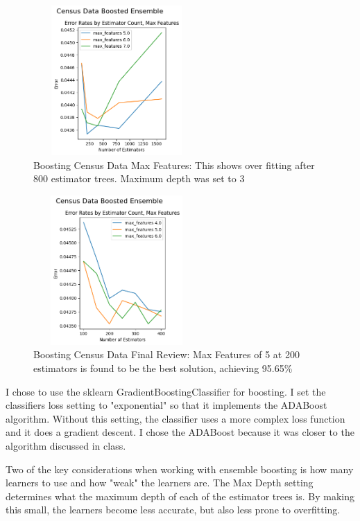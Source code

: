\documentclass[letterpaper]{article} %
\begin{document}
\begin{figure}[htb]
\centering
\includegraphics[width=2.5in, height=2.25in]{figures/Census_Data_Boosting_Estimator_Count_by_Max_Depth_boosting_3.png}
\caption{Boosting Census Data Max Features:  This shows over fitting after 800 estimator trees.  Maximum depth was set to 3  }
\label{fig:boosting_census_3}
\end{figure}

\begin{figure}[htb]
\centering
\includegraphics[width=2.5in, height=2.25in]{figures/Census_Data_Boosting_Estimator_Count_by_Max_Depth_boosting_4.png}
\caption{Boosting Census Data Final Review:  Max Features of 5 at 200 estimators is found to be the best solution, achieving  95.65\% }
\label{fig:boosting_census_4}
\end{figure}

I chose to use the sklearn GradientBoostingClassifier for boosting.  I set the classifiers loss setting to "exponential" so that it implements the ADABoost algorithm. Without this setting, the classifier uses a more complex loss function and it does a gradient descent.  I chose the ADABoost because it was closer to the algorithm discussed in class.

Two of the key considerations when working with ensemble boosting is how many learners to use and how "weak" the learners are.  The Max Depth setting determines what the maximum depth of each of the estimator trees is.  By making this small, the learners become less accurate, but also less prone to overfitting. 
\end{document}
